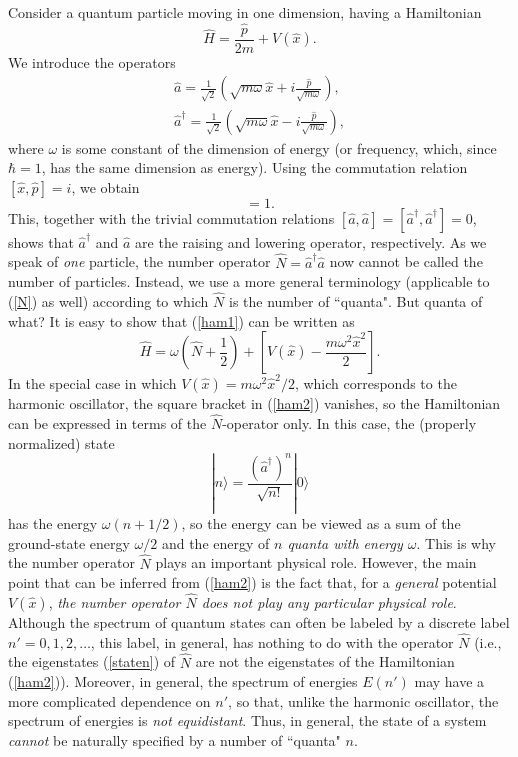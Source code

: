 \documentclass[12pt]{article}
\begin{document}
Consider a quantum particle 
moving in one dimension, having a Hamiltonian
\begin{equation}\label{ham1}
\hat{H}=\frac{\hat{p}}{2m}+V(\hat{x}) .
\end{equation}
We introduce the operators
\begin{eqnarray}\label{a1p}
& \hat{a}=\frac{1}{\sqrt{2}} \left( \sqrt{m\omega}\hat{x} 
+i \displaystyle\frac{\hat{p}}{\sqrt{m\omega}} \right) , & \nonumber \\
& \hat{a}^{\dagger}=
\frac{1}{\sqrt{2}} \left( \sqrt{m\omega}\hat{x}   
-i \displaystyle\frac{\hat{p}}{\sqrt{m\omega}} \right) ,
\end{eqnarray}
where $\omega$ is some constant of the dimension of energy
(or frequency, which, since $\hbar=1$, has the same dimension as energy).
Using the commutation relation $[\hat{x},\hat{p}]=i$, we obtain
\begin{equation}
[\hat{a},\hat{a}^{\dagger}]=1 .
\end{equation}
This, together with the trivial commutation relations
$[\hat{a},\hat{a}]=[\hat{a}^{\dagger},\hat{a}^{\dagger}]=0$, 
shows that $\hat{a}^{\dagger}$ and $\hat{a}$ are the 
raising and lowering operator, respectively.
As we speak of {\em one} particle, 
the number operator $\hat{N}=\hat{a}^{\dagger}\hat{a}$ 
now cannot be called the number of particles. Instead, 
we use a more general terminology (applicable to (\ref{N}) 
as well) according to which $\hat{N}$ is the number of 
``quanta". But quanta of what? It is easy to show that 
(\ref{ham1}) can be written as
\begin{equation}\label{ham2}
\hat{H}=\omega\left( \hat{N}+\frac{1}{2} \right)
+\left[ V(\hat{x})-\frac{m\omega^2\hat{x}^2}{2} \right] .
\end{equation}  
In the special case in which 
$V(\hat{x})=m\omega^2\hat{x}^2/2$, which corresponds to the 
harmonic oscillator, the square bracket in (\ref{ham2})
vanishes, so the Hamiltonian can be expressed 
in terms of the $\hat{N}$-operator only. In this case, 
the (properly normalized) state
\begin{equation}\label{staten}
|n\rangle = \frac{(\hat{a}^{\dagger})^n}{\sqrt{n!}} |0\rangle
\end{equation}
has the energy $\omega (n+1/2)$, so the energy can be viewed
as a sum of the ground-state energy $\omega/2$ and the
energy of {\em $n$ quanta with energy $\omega$}. 
This is why the number operator $\hat{N}$ plays an important physical role.  
However, the main point that can be inferred from (\ref{ham2}) 
is the fact that, for a {\em general} potential $V(\hat{x})$, 
{\em the number operator
$\hat{N}$ does not play any particular physical role}.
Although the spectrum of quantum states can often be labeled 
by a discrete label $n'=0,1,2,\ldots$, this label, in general, 
has nothing to do with the operator $\hat{N}$ (i.e., the eigenstates
(\ref{staten}) of $\hat{N}$ are not the eigenstates of 
the Hamiltonian (\ref{ham2})). Moreover, 
in general, the spectrum of energies $E(n')$ may have a more 
complicated dependence on $n'$, so that, unlike the 
harmonic oscillator, the spectrum of energies is {\em not equidistant}.
Thus, in general, the state of a system 
{\em cannot} be naturally specified by a number of ``quanta" $n$.  
\end{document}
